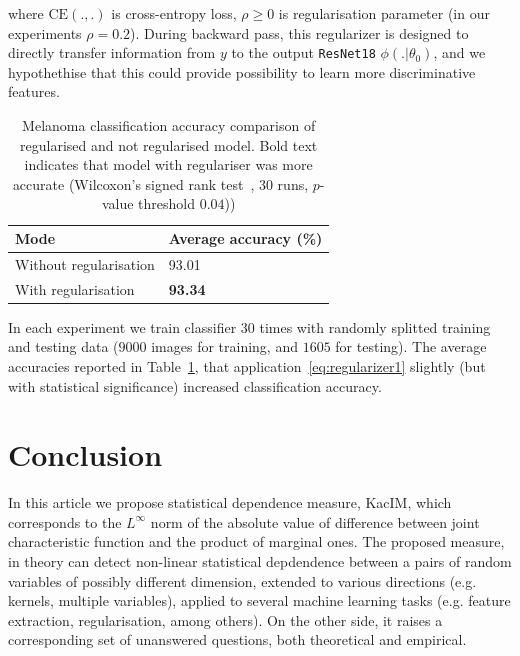 \documentclass{article}
\newcommand{\CE}{\mathrm{CE}}
\begin{document}
\noindent where $\CE(.,.)$ is cross-entropy loss, $\rho \geq 0$ is regularisation parameter (in our experiments $\rho = 0.2$). During backward pass, this regularizer is designed to directly transfer information from $y$ to the output \verb|ResNet18| $\phi(.|\theta_{0})$, and we hypothethise that this could provide possibility to learn more discriminative features.

\begin{table}	
	\centering
	\begin{tabular}{ |p{4cm}|p{3cm}|}
		\hline
		Mode & Average accuracy (\%)  \\
		\hline
		Without regularisation   &   93.01 \\		
		\hline
		With regularisation  &   \textbf{93.34} \\		
		\hline
	\end{tabular}
	\caption{Melanoma classification accuracy comparison of regularised and not regularised model. Bold text indicates that model with regulariser was more accurate (Wilcoxon's signed rank test~\cite{Wilcoxon1992}, 30 runs, $p$-value threshold $0.04$))}
	\label{table:regularisation_classification_accuracies}	
\end{table}


In each experiment we train classifier $30$ times with randomly splitted training and testing data ($9000$ images for training, and $1605$ for testing). The average accuracies reported in Table~\ref{table:regularisation_classification_accuracies}, that application~\eqref{eq:regularizer1} slightly (but with statistical significance) increased classification accuracy.

\section{Conclusion} 

\label{section:conclusion}
In this article we propose statistical dependence measure, KacIM, which corresponds to the $L^{\infty}$ norm of the absolute value of difference between joint characteristic function and the product of marginal ones. The proposed measure, in theory can detect non-linear statistical depdendence between a pairs of random variables of possibly different dimension, extended to various directions (e.g. kernels, multiple variables), applied to several machine learning tasks (e.g. feature extraction, regularisation, among others). On the other side, it raises a corresponding set of unanswered questions, both theoretical and empirical. 
\end{document}
